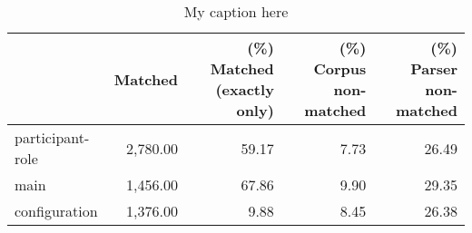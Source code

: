 \begin{table}[!ht]
\centering
\begin{tabular}{lrrrr}
\toprule
{} &  Matched &  (\%) Matched (exactly only) &  (\%) Corpus non-matched &  (\%) Parser non-matched \\
\midrule
participant-role & 2,780.00 &                       59.17 &                    7.73 &                   26.49 \\
main             & 1,456.00 &                       67.86 &                    9.90 &                   29.35 \\
configuration    & 1,376.00 &                        9.88 &                    8.45 &                   26.38 \\
\bottomrule
\end{tabular}
\caption{My caption here}
\label{tab:unit-elements-transitivity-relative}
\end{table}